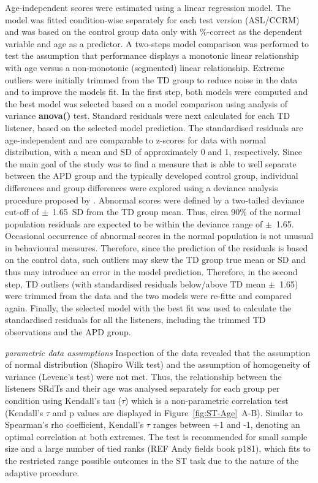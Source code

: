 \documentclass[a4paper, twoside]{templates/ociamthesis}
\begin{document}
Age-independent scores were estimated using a linear regression model. The model was fitted condition-wise separately for each test version (ASL/CCRM) and was based on the control group data only with \%-correct as the dependent variable and age as a predictor. A two-steps model comparison was performed to test the assumption that performance displays a monotonic linear relationship with age versus a non-monotonic (segmented) linear relationship. Extreme outliers were initially trimmed from the TD group to reduce noise in the data and to improve the models fit. In the first step, both models were computed and the best model was selected based on a model comparison using analysis of variance \textbf{anova()} test. Standard residuals were next calculated for each TD listener, based on the selected model prediction. The standardised residuals are age-independent and are comparable to z-scores for data with normal distribution, with a mean and SD of approximately 0 and 1, respectively. Since the main goal of the study was to find a measure that is able to well separate between the APD group and the typically developed control group, individual differences and group differences were explored using a deviance analysis procedure proposed by \textcite{Ramus2003}. Abnormal scores were defined by a two-tailed deviance cut-off of \(\pm\)~1.65~SD from the TD group mean. Thus, circa 90\% of the normal population residuals are expected to be within the deviance range of \(\pm\)~1.65. Occasional occurrence of abnormal scores in the normal population is not unusual in behavioural measures. Therefore, since the prediction of the residuals is based on the control data, such outliers may skew the TD group true mean or SD and thus may introduce an error in the model prediction. Therefore, in the second step, TD outliers (with standardised residuals below/above TD mean \(\pm\)~1.65) were trimmed from the data and the two models were re-fitte and compared again. Finally, the selected model with the best fit was used to calculate the standardised residuals for all the listeners, including the trimmed TD observations and the APD group.

\colorbox[HTML]{CCCCFF}{\emph{parametric data assumptions}}
Inspection of the data revealed that the assumption of normal distribution (Shapiro Wilk test) and the assumption of homogeneity of variance (Levene's test) were not met. Thus, the relationship between the listeners SRdTs and their age was analysed separately for each group per condition using Kendall's tau (\(\tau\)) which is a non-parametric correlation test (Kendall's \(\tau\) and p values are displayed in Figure~\ref{fig:ST-Age}~A-B). Similar to Spearman's rho coefficient, Kendall's \(\tau\) ranges between +1 and -1, denoting an optimal correlation at both extremes. The test is recommended for small sample size and a large number of tied ranks (REF Andy fields book p181), which fits to the restricted range possible outcomes in the ST task due to the nature of the adaptive procedure.
\end{document}

